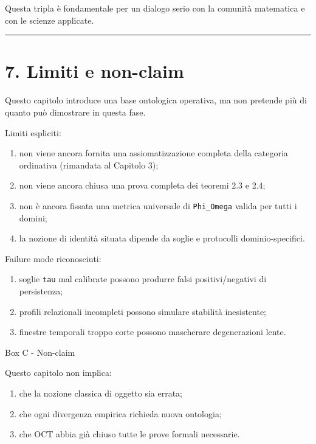 Questa tripla è fondamentale per un dialogo serio con la comunità matematica e con le scienze applicate.

\begin{center}\rule{0.5\linewidth}{0.5pt}\end{center}

\section{7. Limiti e non-claim}

Questo capitolo introduce una base ontologica operativa, ma non pretende più di quanto può dimostrare in questa fase.

Limiti espliciti:

\begin{enumerate}
\def\labelenumi{\arabic{enumi}.}
\tightlist
\item
  non viene ancora fornita una assiomatizzazione completa della categoria ordinativa (rimandata al Capitolo 3);
\item
  non viene ancora chiusa una prova completa dei teoremi 2.3 e 2.4;
\item
  non è ancora fissata una metrica universale di \texttt{Phi\_Omega} valida per tutti i domini;
\item
  la nozione di identità situata dipende da soglie e protocolli dominio-specifici.
\end{enumerate}

Failure mode riconosciuti:

\begin{enumerate}
\def\labelenumi{\arabic{enumi}.}
\tightlist
\item
  soglie \texttt{tau} mal calibrate possono produrre falsi positivi/negativi di persistenza;
\item
  profili relazionali incompleti possono simulare stabilità inesistente;
\item
  finestre temporali troppo corte possono mascherare degenerazioni lente.
\end{enumerate}

Box C - Non-claim

Questo capitolo non implica:

\begin{enumerate}
\def\labelenumi{\arabic{enumi}.}
\tightlist
\item
  che la nozione classica di oggetto sia errata;
\item
  che ogni divergenza empirica richieda nuova ontologia;
\item
  che OCT abbia già chiuso tutte le prove formali necessarie.
\end{enumerate}

